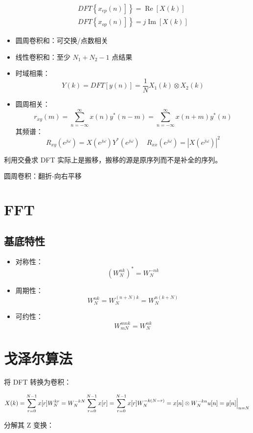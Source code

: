\documentclass[cn,11pt,chinese,black,simple]{elegantbook}
\begin{document}
\begin{itemize}
\[\begin{array}{l}
    \left.D F T\left\{x_{e p}(n)\right]\right\}=\operatorname{Re}[X(k)] \\
    \left.D F T\left\{x_{o p}(n)\right]\right\}=j \operatorname{Im}[X(k)]
    \end{array}
    \]
    \item 圆周卷积和：可交换/点数相关
    \item 线性卷积和：至少 \(N_1 + N_2 - 1\) 点结果
    \item 时域相乘：\[
        Y(k)=D F T[y(n)]=\frac{1}{N} X_{1}(k) \otimes X_{2}(k)
        \]
    \item 圆周相关：\[
        r_{x y}(m)=\sum_{n=-\infty}^{\infty} x(n) y^{*}(n-m)=\sum_{n=-\infty}^{\infty} x(n+m) y^{*}(n)
        \]
        其频谱：\[
            R_{x y}\left(e^{j \omega}\right)=X\left(e^{j \omega}\right) Y^{*}\left(e^{j \omega}\right) \quad R_{x x}\left(e^{j \omega}\right)=\left|X\left(e^{j \omega}\right)\right|^{2}
            \]
\end{itemize}


利用交叠求 DFT 实际上是搬移，搬移的源是原序列而不是补全的序列。

圆周卷积：翻折-向右平移

\section{FFT}


\subsection{基底特性}

\begin{itemize}
    \item 对称性：\[(W_{N}^{nk})^* = W_N^{-nk}\]
    \item 周期性：\[W_N^{nk} = W_N^{(n + N)k} = W_N^{n(k + N)}\]
    \item 可约性：\[W_{mN}^{mnk} = W_N^{nk}\]
\end{itemize}

\section{戈泽尔算法}

将 DFT 转换为卷积：

\[X(k) = \sum_{r = 0}^{N-1} x[r]W_N^{kr} = W_N^{-kN} \sum_{r=0}^{N-1} x[r] = \sum_{r = 0}^{N-1} x[r]W_N^{-k(N-r)} = x[n] \otimes W_N^{-kn} u[n] = y[n]\Big|_{n=N}\]

分解其 Z 变换：
\end{document}
